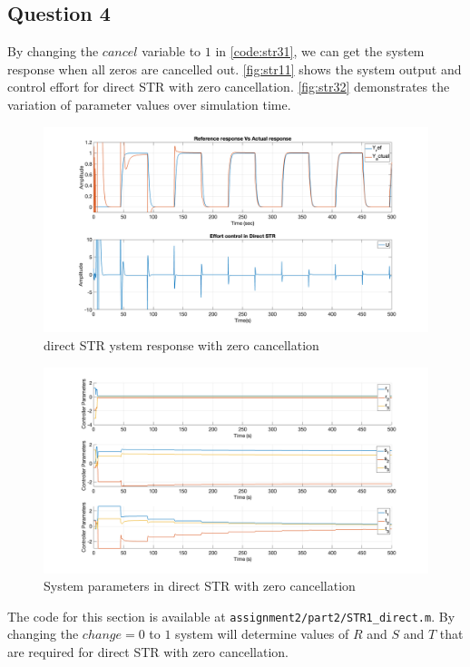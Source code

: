 \FloatBarrier
\subsection{Question 4}
By changing the $cancel$ variable to $1$ in \autoref{code:str31}, we can get the system response when all zeros are cancelled out. 
\autoref{fig:str11} shows the system output and control effort for direct STR with zero cancellation.  \autoref{fig:str32} demonstrates the variation of parameter values over simulation time.

\begin{figure}
	\centering
	\includegraphics[width=\textwidth]{images/str41.png}
	\caption{direct STR ystem response with zero cancellation}
	\label{fig:str41}
\end{figure}

\begin{figure}
	\centering
	\includegraphics[width=\textwidth]{images/str42.png}
	\caption{System parameters in direct STR with zero cancellation}
	\label{fig:str42}
\end{figure}

The code  for this section is available at \lstinline|assignment2/part2/STR1_direct.m|. By changing the $change=0$ to $1$ system will determine values of  $R$ and $S$ and $T$ that are required for direct STR with zero cancellation. 


